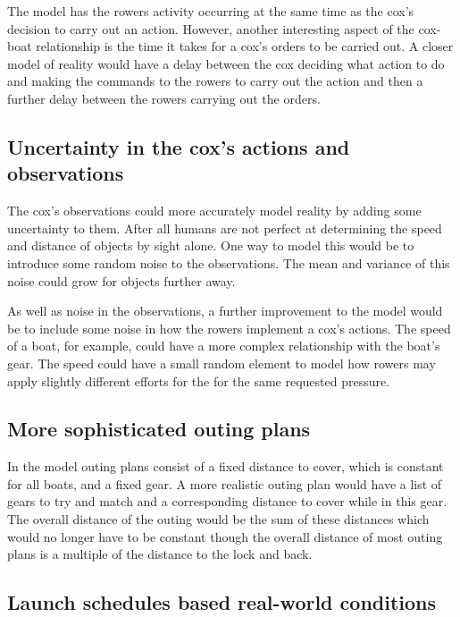 The model has the rowers activity occurring at the same time as the cox's decision to carry out an action. However, another interesting aspect of the cox-boat relationship is the time it takes for a cox's orders to be carried out. A closer model of reality would have a delay between the cox deciding what action to do and making the commands to the rowers to carry out the action and then a further delay between the rowers carrying out the orders.

\subsection{Uncertainty in the cox's actions and observations}

The cox's observations could more accurately model reality by adding some uncertainty to them. After all humans are not perfect at determining the speed and distance of objects by sight alone. One way to model this would be to introduce some random noise to the observations. The mean and variance of this noise could grow for objects further away.

As well as noise in the observations, a further improvement to the model would be to include some noise in how the rowers implement a cox's actions. The speed of a boat, for example, could have a more complex relationship with the boat's gear. The speed could have a small random element to model how rowers may apply slightly different efforts for the for the same requested pressure.

\subsection{More sophisticated outing plans}\label{model:future:outing_plans}

In the model outing plans consist of a fixed distance to cover, which is constant for all boats, and a fixed gear. A more realistic outing plan would have a list of gears to try and match and a corresponding distance to cover while in this gear. The overall distance of the outing would be the sum of these distances which would no longer have to be constant though the overall distance of most outing plans is a multiple of the distance to the lock and back.

\subsection{Launch schedules based real-world conditions}\label{model:future:launch_schedule}

